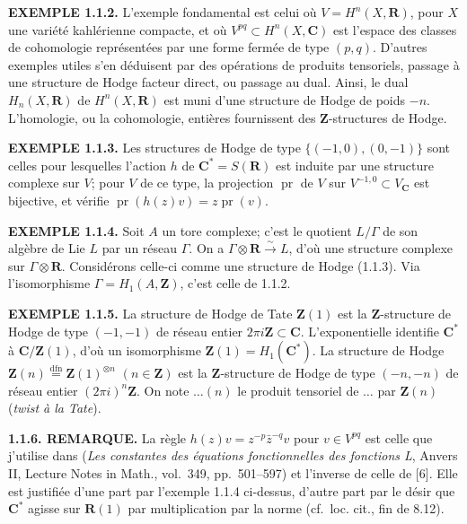 \documentclass[10pt,a4paper]{article}
\begin{document}
\textbf{EXEMPLE 1.1.2.} L'exemple fondamental est celui où \(V=H^n(X,\mathbf R)\), pour \(X\) une variété kahlérienne compacte, et où \(V^{pq}\subset H^n(X,\mathbf C)\) est l'espace des classes de cohomologie représentées par une forme fermée de type \((p,q)\). D'autres exemples utiles s'en déduisent par des opérations de produits tensoriels, passage à une structure de Hodge facteur direct, ou passage au dual. Ainsi, le dual \(H_n(X,\mathbf R)\) de \(H^n(X,\mathbf R)\) est muni d'une structure de Hodge de poids \(-n\). L'homologie, ou la cohomologie, entières fournissent des \(\mathbf Z\)-structures de Hodge.

\textbf{EXEMPLE 1.1.3.} Les structures de Hodge de type \(\{(-1,0),(0,-1)\}\) sont celles pour lesquelles l'action \(h\) de \(\mathbf C^*=S(\mathbf R)\) est induite par une structure complexe sur \(V\); pour \(V\) de ce type, la projection \(\operatorname{pr}\) de \(V\) sur \(V^{-1,0}\subset V_{\mathbf C}\) est bijective, et vérifie \(\operatorname{pr}(h(z)v)=z\operatorname{pr}(v)\).

\textbf{EXEMPLE 1.1.4.} Soit \(A\) un tore complexe; c'est le quotient \(L/\Gamma\) de son algèbre de Lie \(L\) par un réseau \(\Gamma\). On a \(\Gamma\otimes\mathbf R\xrightarrow{\sim}L\), d'où une structure complexe sur \(\Gamma\otimes\mathbf R\). Considérons celle-ci comme une structure de Hodge (1.1.3). Via l'isomorphisme \(\Gamma=H_1(A,\mathbf Z)\), c'est celle de 1.1.2.

\textbf{EXEMPLE 1.1.5.} La structure de Hodge de Tate \(\mathbf Z(1)\) est la \(\mathbf Z\)-structure de Hodge de type \((-1,-1)\) de réseau entier \(2\pi i\mathbf Z\subset\mathbf C\). L'exponentielle identifie \(\mathbf C^*\) à \(\mathbf C/\mathbf Z(1)\), d'où un isomorphisme \(\mathbf Z(1)=H_1(\mathbf C^*)\). La structure de Hodge \(\mathbf Z(n)\stackrel{\mathrm{dfn}}{=}\mathbf Z(1)^{\otimes n}\) \((n\in\mathbf Z)\) est la \(\mathbf Z\)-structure de Hodge de type \((-n,-n)\) de réseau entier \((2\pi i)^n\mathbf Z\). On note \(\ldots(n)\) le produit tensoriel de \(\ldots\) par \(\mathbf Z(n)\) (\emph{twist à la Tate}).

\textbf{1.1.6. REMARQUE.} La règle \(h(z)v=z^{-p}\bar z^{-q}v\) pour \(v\in V^{pq}\) est celle que j'utilise dans (\emph{Les constantes des équations fonctionnelles des fonctions L}, Anvers II, Lecture Notes in Math., vol.~349, pp.~501--597) et l'inverse de celle de {[}6{]}. Elle est justifiée d'une part par l'exemple 1.1.4 ci-dessus, d'autre part par le désir que \(\mathbf C^*\) agisse sur \(\mathbf R(1)\) par multiplication par la norme (cf.~loc. cit., fin de 8.12).
\end{document}
